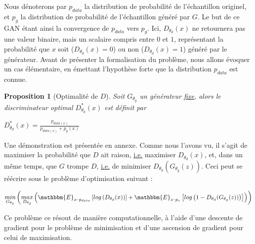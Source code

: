 \documentclass[letterpaper]{oup-contemporary}
\newtheorem{prop}{Proposition}
\begin{document}
Nous dénoterons par $p_{data}$ la distribution de probabilité de l'échantillon originel, et $p_g$ la distribution de probabilité de l'échantillon généré par $G$. 
Le but de ce GAN étant ainsi la convergence de $p_{data}$ vers $p_g$.
Ici, $D_{\theta_d}(x)$ ne retournera pas une valeur binaire, mais un scalaire compris entre $0$ et $1$, représentant la probabilité que $x$ soit ($D_{\theta_d}(x)=0$) ou non ($D_{\theta_d}(x)=1$) généré par le générateur. \newline
Avant de présenter la formalisation du problème, nous allons évoquer un cas élémentaire, en émettant l'hypothèse forte que la distribution $p_{data}$ est connue.
\begin{prop}[Optimalité de $D$]
    Soit $G_{\theta_g}$ un générateur \underline{fixe}, alors le discriminateur optimal $D^*_{\theta_d}(x)$ est définit par
    \begin{center}
        $D^*_{\theta_d}(x) = \frac{p_{data(x)}}{p_{data(x)} + p_g(x)}$ 
    \end{center}
\end{prop}
Une démonstration est présentée en annexe.\newline
Comme nous l'avons vu, il s'agit de maximiser la probabilité que $D$ ait raison, \underline{i.e.} maximiser $D_{\theta_d}(x)$, et, dans un même temps, que $G$ trompe $D$, \underline{i.e.} de minimiser $D_{\theta_d}(G_{\theta_g}(z))$.
Ceci peut se réécrire sous le problème d'optimisation suivant :
\begin{center}
    $\underset{G_{\theta_g}}{min}\left(\underset{D_{\theta_d}}{max}\left(\mathbbm{E}_{x \text{\textasciitilde} p_{data}}\left[log\left(D_{\theta_d}(x)\right)\right] + \mathbbm{E}_{z \text{\textasciitilde} p_z}\left[log\left(1 - D_{\theta_d}(G_{\theta_g}(z))\right)\right]\right)\right)$
\end{center}

Ce problème ce résout de manière computationnelle, à l'aide d'une descente de gradient pour le problème de minimisation et d'une ascension de gradient pour celui de maximisation. 
\end{document}
